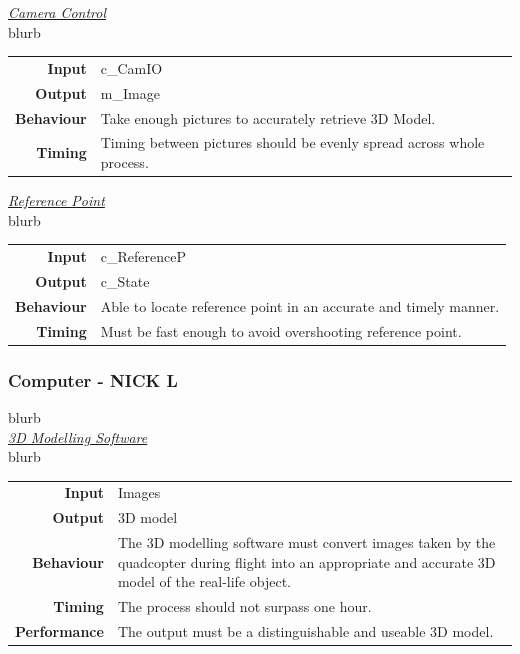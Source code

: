 \documentclass[10pt,letterpaper]{article}
\begin{document}
\underline{\textit{Camera Control}} \\[2mm]
blurb
\begin{center}
  \begin{tabular}{r p{8.5cm}}
      \textbf{Input} & c\_CamIO \\
      \textbf{Output} & m\_Image \\
      \textbf{Behaviour} & Take enough pictures to accurately retrieve 3D Model. \\
      \textbf{Timing} & Timing between pictures should be evenly spread across whole process. \\
  \end{tabular}
\end{center}

\underline{\textit{Reference Point}} \\[2mm]
blurb
\begin{center}
  \begin{tabular}{r p{8.5cm}}
      \textbf{Input} & c\_ReferenceP \\
      \textbf{Output} & c\_State \\
      \textbf{Behaviour} & Able to locate reference point in an accurate and timely manner. \\
      \textbf{Timing} & Must be fast enough to avoid overshooting reference point. \\
  \end{tabular}
\end{center}


\subsubsection{Computer - NICK L}
blurb \\

\underline{\textit{3D Modelling Software}} \\[2mm]
blurb
\begin{center}
  \begin{tabular}{r p{8.5cm}}
      \textbf{Input} & Images \\
      \textbf{Output} & 3D model \\
      \textbf{Behaviour} & The 3D modelling software must convert images taken by the quadcopter during flight into an appropriate and accurate 3D model of the real-life object. \\
      \textbf{Timing} & The process should not surpass one hour. \\
      \textbf{Performance} & The output must be a distinguishable and useable 3D model.
  \end{tabular}
\end{center}
\end{document}
